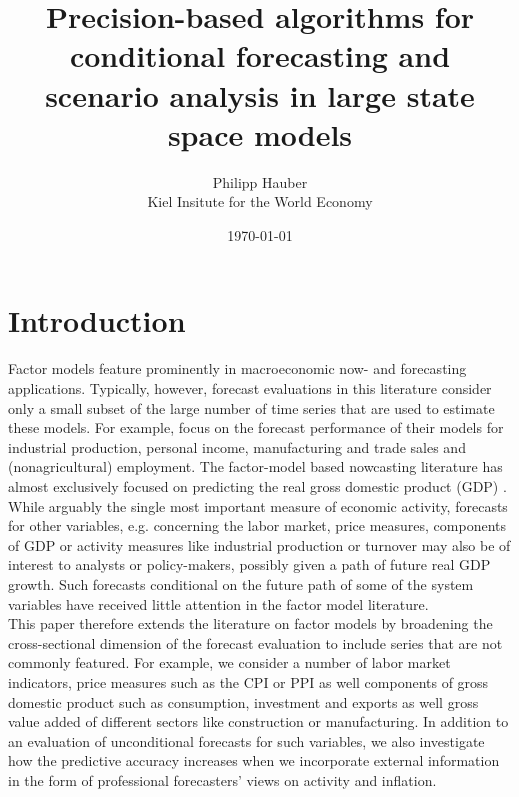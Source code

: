 \documentclass[notitlepage,a4paper,12pt]{article}
\begin{document}
\title{Precision-based algorithms for conditional forecasting and scenario analysis in large state space models}

\author{
  Philipp Hauber\\
  Kiel Insitute for the World Economy
}
\date{\today}

\maketitle

\section{Introduction}

Factor models feature prominently in macroeconomic now- and forecasting applications. Typically, however, forecast evaluations in this literature consider only a small subset of the large number of time series that are used to estimate these models. For example, \citet{stockwatson_2002} focus on the forecast performance of their models for industrial production, personal income, manufacturing and trade sales and (nonagricultural) employment. The factor-model based nowcasting literature has almost exclusively focused on predicting the real gross domestic product (GDP) \citep[see][]{grs_2008, bok_etal_2018, breitungschumacher_2008, kms_jae_2013}. While arguably the single most important measure of economic activity, forecasts for other variables, e.g. concerning the labor market, price measures, components of GDP or activity measures like industrial production or turnover may also be of interest to analysts or policy-makers, possibly given a path of future real GDP growth. Such forecasts conditional on the future path of some of the system variables have received little attention in the factor model literature.\\

This paper therefore extends the literature on factor models by broadening the cross-sectional dimension of the forecast evaluation to include series that are not commonly featured. For example, we consider a number of labor market indicators, price measures such as the CPI or PPI as well components of gross domestic product such as consumption, investment and exports as well gross value added of different sectors like construction or manufacturing. In addition to an evaluation of unconditional forecasts for such variables, we also investigate how the predictive accuracy increases when we incorporate external information in the form of professional forecasters' views on activity and inflation. \\
\end{document}
